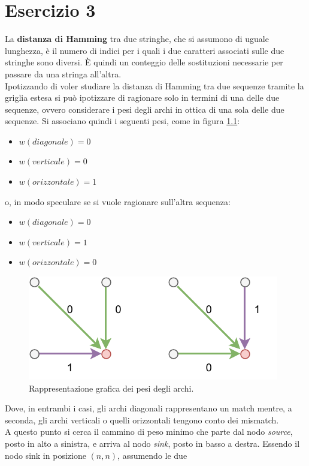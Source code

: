 \documentclass[a4paper,12pt, oneside]{book}
\begin{document}
\chapter{Esercizio 3}
La \textbf{distanza di Hamming} tra due stringhe, che si assumono di uguale
lunghezza, è 
il numero di indici per i quali i due caratteri associati sulle due stringhe
sono diversi. È quindi un conteggio delle sostituzioni necessarie per passare da
una stringa all'altra.\\
Ipotizzando di voler studiare la distanza di Hamming tra due sequenze tramite la
griglia estesa si può ipotizzare di ragionare solo in termini di una delle due
sequenze, ovvero considerare i pesi degli archi in ottica di una sola delle due
sequenze. Si associano quindi i seguenti pesi, come in figura \ref{fig:pes3}:
\begin{itemize}
  \item $w(diagonale)=0$
  \item $w(verticale)=0$
  \item $w(orizzontale)=1$
\end{itemize}
o, in modo speculare se si vuole ragionare sull'altra sequenza:
\begin{itemize}
  \item $w(diagonale)=0$
  \item $w(verticale)=1$
  \item $w(orizzontale)=0$
\end{itemize}
\begin{figure}
  \centering
  \includegraphics[scale = 1.3]{img/es31.pdf}
  \caption{Rappresentazione grafica dei pesi degli archi.}
  \label{fig:pes3}
\end{figure}
Dove, in entrambi i casi, gli archi diagonali rappresentano un match mentre, a
seconda, gli archi verticali o quelli orizzontali tengono conto dei mismatch.\\
A questo punto si cerca il cammino di peso minimo che parte dal nodo
\textit{source}, posto in alto a sinistra, e arriva al nodo \textit{sink}, posto
in basso a destra. Essendo il nodo sink in posizione $(n,n)$, assumendo le due 
\end{document}
